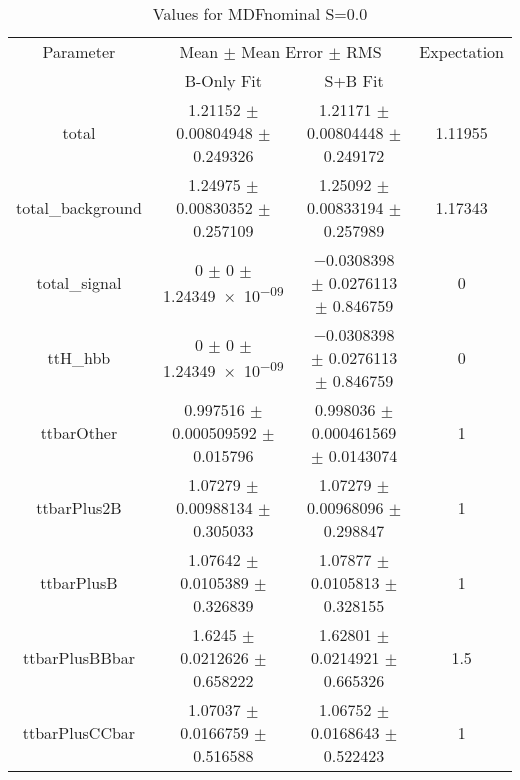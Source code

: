 \begin{table}
\centering
\caption{Values for MDFnominal S=0.0}
\begin{tabular}{cccc}
\toprule
Parameter & \multicolumn{2}{c}{Mean $\pm$ Mean Error $\pm$ RMS} & Expectation\\
 & B-Only Fit & S+B Fit & \\
\midrule
total & \num{1.21152} $\pm$ \num{0.00804948} $\pm$ \num{0.249326} & \num{1.21171} $\pm$ \num{0.00804448} $\pm$ \num{0.249172} & \num{1.11955}\\
total\_background & \num{1.24975} $\pm$ \num{0.00830352} $\pm$ \num{0.257109} & \num{1.25092} $\pm$ \num{0.00833194} $\pm$ \num{0.257989} & \num{1.17343}\\
total\_signal & \num{0} $\pm$ \num{0} $\pm$ \num{1.24349e-09} & \num{-0.0308398} $\pm$ \num{0.0276113} $\pm$ \num{0.846759} & \num{0}\\
ttH\_hbb & \num{0} $\pm$ \num{0} $\pm$ \num{1.24349e-09} & \num{-0.0308398} $\pm$ \num{0.0276113} $\pm$ \num{0.846759} & \num{0}\\
ttbarOther & \num{0.997516} $\pm$ \num{0.000509592} $\pm$ \num{0.015796} & \num{0.998036} $\pm$ \num{0.000461569} $\pm$ \num{0.0143074} & \num{1}\\
ttbarPlus2B & \num{1.07279} $\pm$ \num{0.00988134} $\pm$ \num{0.305033} & \num{1.07279} $\pm$ \num{0.00968096} $\pm$ \num{0.298847} & \num{1}\\
ttbarPlusB & \num{1.07642} $\pm$ \num{0.0105389} $\pm$ \num{0.326839} & \num{1.07877} $\pm$ \num{0.0105813} $\pm$ \num{0.328155} & \num{1}\\
ttbarPlusBBbar & \num{1.6245} $\pm$ \num{0.0212626} $\pm$ \num{0.658222} & \num{1.62801} $\pm$ \num{0.0214921} $\pm$ \num{0.665326} & \num{1.5}\\
ttbarPlusCCbar & \num{1.07037} $\pm$ \num{0.0166759} $\pm$ \num{0.516588} & \num{1.06752} $\pm$ \num{0.0168643} $\pm$ \num{0.522423} & \num{1}\\
\bottomrule
\end{tabular}
\end{table}